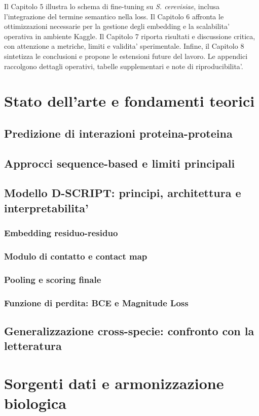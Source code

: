 \documentclass[12pt,a4paper,oneside]{report} %
\begin{document}
Il Capitolo 5 illustra lo schema di fine-tuning su \textit{S. cerevisiae}, inclusa l'integrazione del termine semantico nella loss. Il Capitolo 6 affronta le ottimizzazioni necessarie per la gestione degli embedding e la scalabilita' operativa in ambiente Kaggle. Il Capitolo 7 riporta risultati e discussione critica, con attenzione a metriche, limiti e validita' sperimentale. Infine, il Capitolo 8 sintetizza le conclusioni e propone le estensioni future del lavoro. Le appendici raccolgono dettagli operativi, tabelle supplementari e note di riproducibilita'.

\chapter{Stato dell'arte e fondamenti teorici}
\section{Predizione di interazioni proteina-proteina}
\section{Approcci sequence-based e limiti principali}
\section{Modello D-SCRIPT: principi, architettura e interpretabilita'}
\subsection{Embedding residuo-residuo}
\subsection{Modulo di contatto e contact map}
\subsection{Pooling e scoring finale}
\subsection{Funzione di perdita: BCE e Magnitude Loss}
\section{Generalizzazione cross-specie: confronto con la letteratura}

\chapter{Sorgenti dati e armonizzazione biologica}
\end{document}

